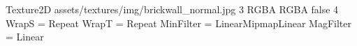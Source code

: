 Texture2D
assets/textures/img/brickwall_normal.jpg
3
RGBA
RGBA
false
4
WrapS = Repeat
WrapT = Repeat
MinFilter = LinearMipmapLinear
MagFilter = Linear
